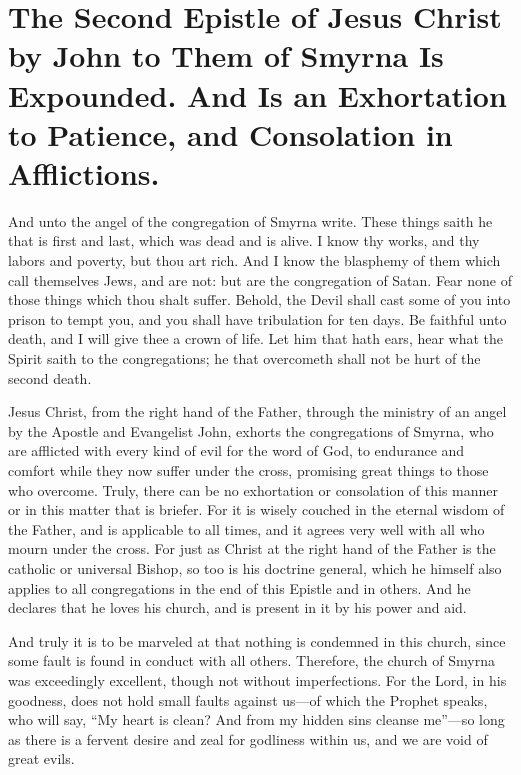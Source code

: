 \chapter[Sermon 9. The Second Epistle of Jesus Christ by John to Them of Smyrna Is Expounded. And Is an Exhortation to Patience, and Consolation in Afflictions.]{The Second Epistle of Jesus Christ by John to Them of Smyrna Is Expounded. And Is an Exhortation to Patience, and Consolation in Afflictions.}
\label{sermon:009}

And unto the angel of the congregation of Smyrna write. These things saith he that is first and last, which was dead and is alive. I know thy works, and thy labors and poverty, but thou art rich. And I know the blasphemy of them which call themselves Jews, and are not: but are the congregation of Satan. Fear none of those things which thou shalt suffer. Behold, the Devil shall cast some of you into prison to tempt you, and you shall have tribulation for ten days. Be faithful unto death, and I will give thee a crown of life. Let him that hath ears, hear what the Spirit saith to the congregations; he that overcometh shall not be hurt of the second death.

Jesus Christ, from the right hand of the Father, through the ministry of an angel by the Apostle and Evangelist John, exhorts the congregations of Smyrna, who are afflicted with every kind of evil for the word of God, to endurance and comfort while they now suffer under the cross, promising great things to those who overcome. Truly, there can be no exhortation or consolation of this manner or in this matter that is briefer. For it is wisely couched in the eternal wisdom of the Father, and is applicable to all times, and it agrees very well with all who mourn under the cross. For just as Christ at the right hand of the Father is the catholic or universal Bishop, so too is his doctrine general, which he himself also applies to all congregations in the end of this Epistle and in others. And he declares that he loves his church, and is present in it by his power and aid.

And truly it is to be marveled at that nothing is condemned in this church, since some fault is found in conduct with all others. Therefore, the church of Smyrna was exceedingly excellent, though not without imperfections. For the Lord, in his goodness, does not hold small faults against us—of which the Prophet speaks, who will say, “My heart is clean? And from my hidden sins cleanse me”—so long as there is a fervent desire and zeal for godliness within us, and we are void of great evils.

